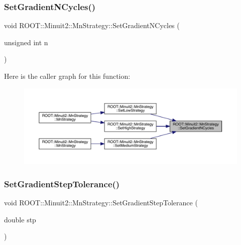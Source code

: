 \mbox{\label{classROOT_1_1Minuit2_1_1MnStrategy_abf74d8c002c658339f15df4b56aa4fdb}} 
\subsubsection{\texorpdfstring{SetGradientNCycles()}{SetGradientNCycles()}\hspace{0.1cm}{\footnotesize\ttfamily [3/3]}}
{\footnotesize\ttfamily void R\+O\+O\+T\+::\+Minuit2\+::\+Mn\+Strategy\+::\+Set\+Gradient\+N\+Cycles (\begin{DoxyParamCaption}\item[{unsigned int}]{n }\end{DoxyParamCaption})\hspace{0.3cm}{\ttfamily [inline]}}

Here is the caller graph for this function\+:
\nopagebreak
\begin{figure}[H]
\begin{center}
\leavevmode
\includegraphics[width=350pt]{da/de4/classROOT_1_1Minuit2_1_1MnStrategy_abf74d8c002c658339f15df4b56aa4fdb_icgraph}
\end{center}
\end{figure}
\mbox{\label{classROOT_1_1Minuit2_1_1MnStrategy_ad6051100db67df070103c2478740ee8f}} 
\subsubsection{\texorpdfstring{SetGradientStepTolerance()}{SetGradientStepTolerance()}\hspace{0.1cm}{\footnotesize\ttfamily [1/3]}}
{\footnotesize\ttfamily void R\+O\+O\+T\+::\+Minuit2\+::\+Mn\+Strategy\+::\+Set\+Gradient\+Step\+Tolerance (\begin{DoxyParamCaption}\item[{double}]{stp }\end{DoxyParamCaption})\hspace{0.3cm}{\ttfamily [inline]}}

